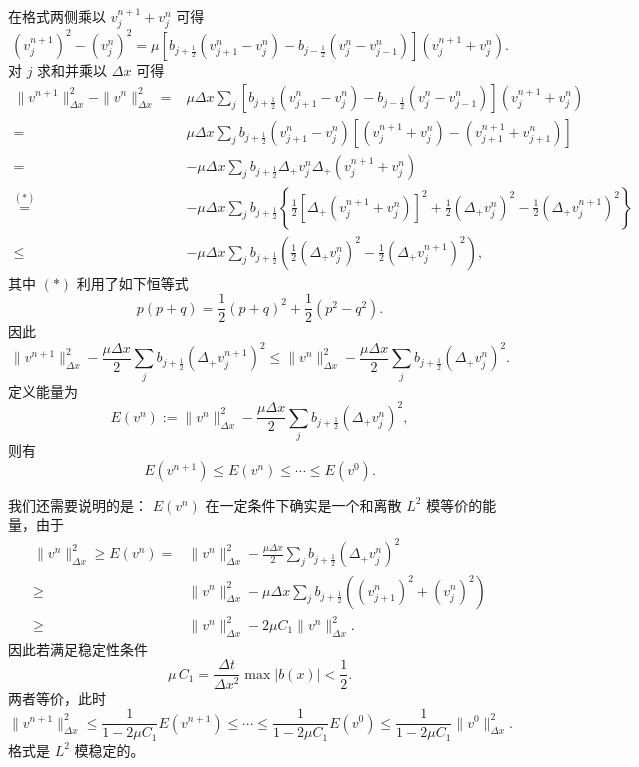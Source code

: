 \begin{solution*}
    在格式两侧乘以 $v_j^{n+1} + v_j^n$ 可得
    \[
        (v_j^{n+1})^2 - (v_j^n)^2 = \mu \left[ b_{j+\frac12} (v_{j+1}^n - v_j^{n})
        - b_{j-\frac12} (v_{j}^n - v_{j-1}^{n})\right](v_j^{n+1} + v_j^n).
    \]
    对 $j$ 求和并乘以 $\Delta x$ 可得
    \begin{align*}
        \|v^{n+1}\|_{\Delta x}^2 - \|v^{n}\|_{\Delta x}^2
        ={}                & \mu \Delta x \sum_j \left[ b_{j+\frac12} (v_{j+1}^n - v_j^{n})
        - b_{j-\frac12} (v_{j}^n - v_{j-1}^{n})\right](v_j^{n+1} + v_j^n)
        \\
        ={}                & \mu \Delta x \sum_j b_{j+\frac12} (v_{j+1}^n - v_j^{n})
        \left[(v_j^{n+1} + v_j^n) - (v_{j+1}^{n+1} + v_{j+1}^n)\right]
        \\
        ={}                & - \mu \Delta x \sum_j b_{j+\frac12} \Delta_+ v_j^n \Delta_+(v_j^{n+1}+v_j^n)
        \\
        \overset{(*)}{=}{} & - \mu \Delta x \sum_j b_{j+\frac12}
        \left\{
        \frac12 \left[\Delta_+(v_j^{n+1}+v_j^n)\right]^2
        + \frac12  (\Delta_+ v_j^n)^2  - \frac12  (\Delta_+ v_j^{n+1})^2
        \right\}
        \\
        \le{}              & - \mu \Delta x \sum_j b_{j+\frac12}
        \left(
        \frac12  (\Delta_+ v_j^n)^2  - \frac12  (\Delta_+ v_j^{n+1})^2
        \right),
    \end{align*}
    其中 $(*)$ 利用了如下恒等式
    \[
        p(p+q) = \frac12(p+q)^2 + \frac12(p^2-q^2).
    \]
    因此
    \[
        \|v^{n+1}\|_{\Delta x}^2 - \frac{\mu \Delta x}2 \sum_j b_{j+\frac12}
        (\Delta_+ v_j^{n+1})^2
        \le
        \|v^{n}\|_{\Delta x}^2 - \frac{\mu \Delta x}2 \sum_j b_{j+\frac12}
        (\Delta_+ v_j^{n})^2.
    \]
    定义能量为
    \[
        E(v^n) := \|v^{n}\|_{\Delta x}^2 - \frac{\mu \Delta x}2 \sum_j b_{j+\frac12}
        (\Delta_+ v_j^{n})^2,
    \]
    则有
    \[
        E(v^{n+1}) \le E(v^n) \le \cdots \le E(v^0).
    \]

    我们还需要说明的是： $E(v^n)$ 在一定条件下确实是一个和离散 $L^2$ 模等价的能量，由于
    \begin{align*}
        \|v^{n}\|_{\Delta x}^2 \ge{}
        E(v^n) ={} & \|v^{n}\|_{\Delta x}^2 - \frac{\mu \Delta x}2 \sum_j b_{j+\frac12}
        (\Delta_+ v_j^{n})^2                                                            \\
        \ge{}      & \|v^{n}\|_{\Delta x}^2 -  \mu \Delta x  \sum_j b_{j+\frac12}
        ((v_{j+1}^{n})^2 + (v_{j}^{n})^2)                                               \\
        \ge{}      & \|v^{n}\|_{\Delta x}^2 -  2\mu C_1
        \|v^{n}\|_{\Delta x}^2.
    \end{align*}
    因此若满足稳定性条件
    \[
        \mu\, C_1 = \frac{\Delta t}{\Delta x^2} \max | b(x)| < \frac12.
    \]
    两者等价，此时
    \[
        \|v^{n+1}\|_{\Delta x}^2 \le \frac{1}{1-2\mu C_1} E(v^{n+1}) \le \cdots \le \frac{1}{1-2\mu C_1}E(v^{0})
        \le \frac{1}{1-2\mu C_1} \|v^{0}\|_{\Delta x}^2.
    \]
    格式是 $L^2$ 模稳定的。
\end{solution*}

